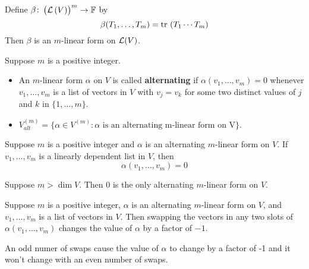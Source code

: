 \documentclass{extarticle}
\begin{document}
\begin{example}
    Define \(\beta \colon \left( \mathcal{L} \left( V \right) \right)^m \to \mathbb{F}\) by 
    \[\beta(T_1, \ldots, T_m) = \text{tr} \ (T_1 \cdots T_m)\]
    Then \(\beta\) is an \(m\)-linear form on \(\mathcal{L}(V)\).
\end{example}

\begin{definition}
    Suppose \(m\) is a positive integer. 
    \begin{itemize}
        \item An \(m\)-linear form \(\alpha\) on \(V\) is called \textbf{alternating} if \(\alpha(v_1, \ldots, v_m) = 0\) 
        whenever \(v_1, \ldots, v_m\) is a list of vectors in \(V\) with \(v_j = v_k\) for some two distinct values 
        of \(j\) and \(k\) in \(\{1, \ldots, m\}\).
        
        \item \(V_{alt}^{(m)} = \{\alpha \in V^{(m)} \colon \alpha \text{ is an alternating m-linear form on V}\}\).
    \end{itemize}
\end{definition}

\begin{corollary}
    Suppose \(m\) is a positive integer and \(\alpha\) is an alternating \(m\)-linear form on \(V\). If 
    \(v_1, \ldots, v_m\) is a linearly dependent list in \(V\), then 
    \[\alpha(v_1, \ldots, v_m) = 0\]
\end{corollary}

\begin{corollary}
    Suppose \(m  > \dim V\). Then 0 is the only alternating \(m\)-linear form on \(V\).
\end{corollary}

\begin{thm}
    Suppose \(m\) is a positive integer, \(\alpha\) is an alternating \(m\)-linear form on \(V\), and 
    \(v_1, \ldots, v_m\) is a list of vectors in \(V\). Then swapping the vectors in any two slots 
    of \(\alpha(v_1, \ldots, v_m)\) changes the value of \(\alpha\) by a factor of \(-1\).
\end{thm}

\begin{remark}
    An odd numer of swaps cause the value of \(\alpha\) to change by a factor of -1 and it won't change with 
    an even number of swaps. 
\end{remark}
\end{document}
